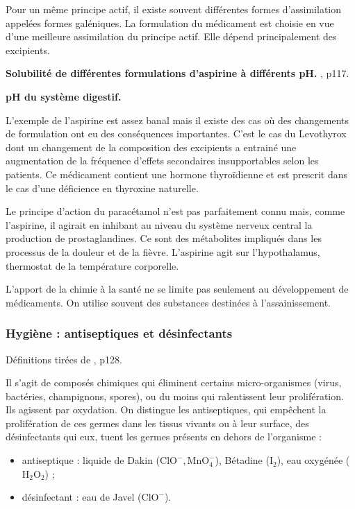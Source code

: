 Pour un même principe actif, il existe souvent différentes formes d'assimilation appelées formes galéniques.
La formulation du médicament est choisie en vue d'une meilleure assimilation du principe actif.
Elle dépend principalement des excipients.

\begin{experience}
\textbf{Solubilité de différentes formulations d'aspirine à différents pH.}
\cite{Bataille2010}, p117.
\end{experience}

\begin{slide}
\textbf{pH du système digestif.}
\end{slide}

L'exemple de l'aspirine est assez banal mais il existe des cas où des changements de formulation ont eu des conséquences importantes.
C'est le cas du Levothyrox \cite{Levothyrox} dont un changement de la composition des excipients a entrainé une augmentation de la fréquence d'effets secondaires insupportables selon les patients.
Ce médicament contient une hormone thyroïdienne et est prescrit dans le cas d'une déficience en thyroxine naturelle.

\begin{remarque}
Le principe d'action du paracétamol n'est pas parfaitement connu mais, comme l'aspirine, il agirait en inhibant au niveau du système nerveux central la production de prostaglandines.
Ce sont des métabolites impliqués dans les processus de la douleur et de la fièvre.
L'aspirine agit sur l'hypothalamus, thermostat de la température corporelle.
\end{remarque}

\begin{transition}
L'apport de la chimie à la santé ne se limite pas seulement au développement de médicaments.
On utilise souvent des substances destinées à l'assainissement.
\end{transition}

\subsubsection{Hygiène : antiseptiques et désinfectants}

Définitions tirées de \cite{Azan2011}, p128.

Il s'agit de composés chimiques qui éliminent certains micro-organismes (virus, bactéries, champignons, spores), ou du moins qui ralentissent leur prolifération.
Ils agissent par oxydation.
On distingue les antiseptiques, qui empêchent la prolifération de ces germes dans les tissus vivants ou à leur surface, des désinfectants qui eux, tuent les germes présents en dehors de l'organisme :
\begin{itemize}
\item antiseptique : liquide de Dakin ($\mathrm{ClO^-, MnO_4^-}$), Bétadine ($\mathrm{I_2}$), eau oxygénée ($\mathrm{H_2O_2}$) ;
\item désinfectant : eau de Javel ($\mathrm{ClO^-}$).
\end{itemize}

